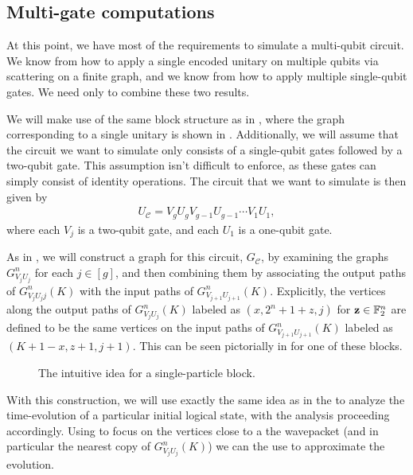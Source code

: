 \documentclass[../thesis-main/thesis-main]{subfiles}
\begin{document}

\subsection{Multi-gate computations}


At this point, we have most of the requirements to simulate a multi-qubit circuit.  We know from  how to apply a single encoded unitary on multiple qubits via scattering on a finite graph, and we know from  how to apply multiple single-qubit gates.  We need only to combine these two results.

We will make use of the same block structure as in , where the graph corresponding to a single unitary is shown in .  Additionally, we will assume that the circuit we want to simulate only consists of a single-qubit gates followed by a two-qubit gate.  This assumption isn't difficult to enforce, as these gates can simply consist of identity operations.  The circuit that we want to simulate is then given by
\begin{align}
  {U}_{\mathcal{C}} = V_{g} U_g V_{g-1} U_{g-1} \cdots V_{1} U_1,
\end{align}
where each $V_j$ is a two-qubit gate, and each $U_1$ is a one-qubit gate.

As in , we will construct a graph for this circuit, $G_{\mathcal{C}}$, by examining the graphs $G_{V_jU_j}^{n}$ for each $j\in [g]$, and then combining them by associating the output paths of $G_{V_jU_jj}^{n}(K)$ with the input paths of $G_{V_{j+1}U_{j+1}}^{n}(K)$.  Explicitly, the vertices along the output paths of $G_{V_jU_j}^{n}(K)$ labeled as $(x,2^{n} + 1 +z, j)$ for $\mathbf{z}\in \mathbb{F}_2^n$ are defined to be the same vertices on the input paths of $G_{V_{j+1}U_{j+1}}^{n}(K)$ labeled as $(K+1-x,z+1,j+1)$.  This can be seen pictorially in  for one of these blocks.


\begin{figure}
  \centering
  
  \caption{The intuitive idea for a single-particle block.}
  \label{fig:SP_block}
\end{figure}
  
With this construction, we will use exactly the same idea as in the  to analyze the time-evolution of a particular initial logical state, with the analysis proceeding accordingly.  Using  to focus on the vertices close to a the wavepacket (and in particular the nearest copy of $G_{V_jU_j}^{n}(K)$) we can the use  to approximate the evolution.
 
\end{document}
